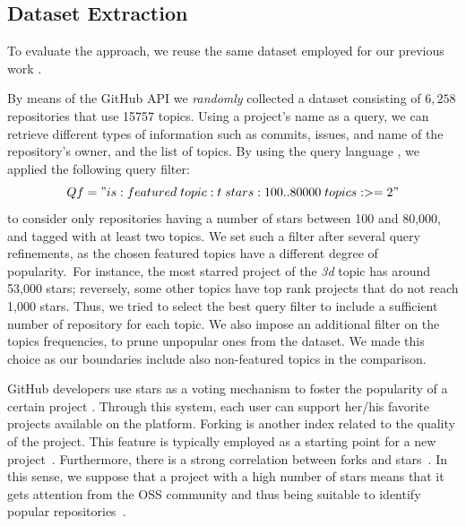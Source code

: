 \subsection{Dataset Extraction} \label{sec:Dataset}



To evaluate the approach, we reuse the same dataset employed for our previous work \cite{MNB_data}.

By means of the GitHub API \cite{githubAPI} we \emph{randomly} collected a dataset consisting of $6,258$ repositories that use 15757 topics.
Using a project's name as a query, we can retrieve different types of information such as commits, issues, and name
of the repository's owner, and the list of topics. By using the \GH query language
\cite{noauthor_understanding_nodate}, we applied the following query filter:
\begin{equation}
\small
Qf = "is:featured \; topic:t \; stars:100..80000 \; topics:>=2"
\end{equation}%
to consider only \GH repositories having a number of stars between 100 and
80,000, and tagged with at least two topics. We set such a filter after several
query refinements, as the chosen featured topics have a different degree of
popularity.~For instance, the most starred project of the \emph{3d} topic has
around 53,000 stars; reversely, some other topics have top rank projects that
do not reach 1,000 stars. Thus, we tried to select the best query filter to
include a sufficient number of repository for each topic.
We also impose an additional filter on the topics frequencies, to prune unpopular ones from the dataset. We made this choice as our boundaries include also non-featured topics in the comparison.



GitHub developers use stars as a voting mechanism to
foster the popularity of a certain project \cite{}. Through this
system, each user can support her/his favorite projects available
on the platform. 
Forking is another index related to the quality of the project. This feature is 
typically employed as a starting point for a new 
project~\cite{Jiang:2017:WDF:3042021.3042043}. Furthermore, there is a strong 
correlation between forks and stars~\cite{7816479}. In this sense, we suppose 
that a project with a high number of stars means that it gets attention from 
the OSS community and thus being suitable to identify popular 
repositories~\cite{borges_popularity_2017, borges_predicting_2016}. 




